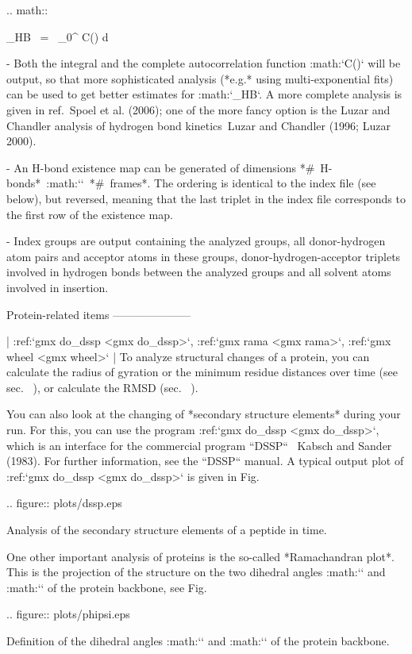    .. math::

      \tau_{HB} ~=~ \int_{0}^{\infty} C(\tau) d\tau
      \label{eqn:hblife}

-  Both the integral and the complete autocorrelation function
   :math:`C(\tau)` will be output, so that more sophisticated analysis
   (*e.g.* using multi-exponential fits) can be used to get better
   estimates for :math:`\tau_{HB}`. A more complete analysis is given in
   ref. Spoel et al. (2006); one of the more fancy option is the Luzar
   and Chandler analysis of hydrogen bond kinetics Luzar and Chandler
   (1996; Luzar 2000).

-  An H-bond existence map can be generated of dimensions
   *# H-bonds*\ :math:`\times`\ *# frames*. The ordering is identical to
   the index file (see below), but reversed, meaning that the last
   triplet in the index file corresponds to the first row of the
   existence map.

-  Index groups are output containing the analyzed groups, all
   donor-hydrogen atom pairs and acceptor atoms in these groups,
   donor-hydrogen-acceptor triplets involved in hydrogen bonds between
   the analyzed groups and all solvent atoms involved in insertion.

Protein-related items
---------------------

| :ref:`gmx do_dssp <gmx do_dssp>`, :ref:`gmx rama <gmx rama>`,
  :ref:`gmx wheel <gmx wheel>`
| To analyze structural changes of a protein, you can calculate the
  radius of gyration or the minimum residue distances over time (see
  sec. 
  ), or calculate the RMSD
  (sec. 
  ).

You can also look at the changing of *secondary structure elements*
during your run. For this, you can use the program 
:ref:`gmx do_dssp <gmx do_dssp>`, which is an interface for the
commercial program ``DSSP``  Kabsch and Sander (1983). For
further information, see the ``DSSP`` manual. A typical
output plot of :ref:`gmx do_dssp <gmx do_dssp>` is given in
Fig. 

.. figure:: plots/dssp.eps

   Analysis of the secondary structure elements of a peptide in time.

One other important analysis of proteins is the so-called *Ramachandran
plot*. This is the projection of the structure on the two dihedral
angles :math:`\phi` and :math:`\psi` of the protein backbone, see
Fig. 

.. figure:: plots/phipsi.eps

   Definition of the dihedral angles :math:`\phi` and :math:`\psi` of
   the protein backbone.

